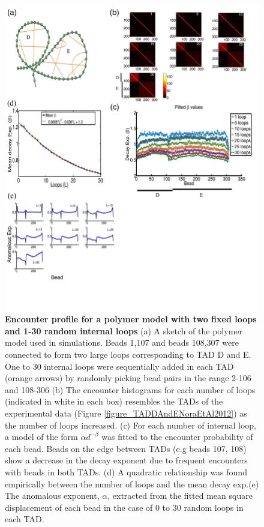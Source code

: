 \documentclass[12pt]{article}
\begin{document}
\begin{figure}[H]
\includegraphics[scale=0.47]{Figure04_TwoTADs0To30RandomLoops307Beads}
\caption{\textbf{Encounter profile for a polymer model with two fixed loops and 1-30 random internal loops} (a) A sketch of the polymer model used in simulations. Beads 1,107 and beads 108,307 were connected to form two large loops corresponding to TAD D and E. One to 30 internal loops were sequentially added in each TAD (orange arrows) by randomly picking bead pairs in the range 2-106 and 108-306 (b) The encounter histograms for each number of loops (indicated in white in each box) resembles the TADs of the experimental data (Figure \ref{figure_TADDAndENoraEtAl2012}) as the number of loops increased. (c) For each number of internal loop, a model of the form $\alpha d^{-\beta}$ was fitted to the encounter probability of each bead. Beads on the edge between TADs (e.g beads 107, 108) show a decrease in the decay exponent due to frequent encounters with beads in both TADs. (d) A quadratic relationship was found empirically between the number of loops and the mean decay exp.(e) The anomalous exponent, $\alpha$, extracted from the fitted mean square displacement of each bead in the case of 0 to 30 random loops in each TAD.}
\label{figure_encounterProfileTwoTADs}
\end{figure}
\end{document}
